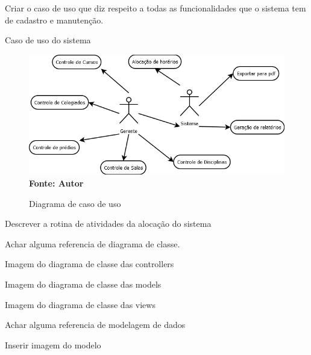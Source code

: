 \documentclass{abntpuc}
\begin{document}


	Criar o caso de uso que diz respeito a todas as funcionalidades que o sistema tem de cadastro e manutenção.\par

	Caso de uso do sistema\par

	\begin{figure}[!htb]
		\centering
   		\caption[Diagrama de caso de uso]{Diagrama de caso de uso}
   		\label{fig:figura2}
   		\centering
   		\includegraphics[scale=0.5]{diagramaCasoUso.png}
   		\\ \textbf{\footnotesize Fonte: Autor}
	\end{figure}


	
	Descrever a rotina de atividades da alocação do sistema
	

		
	Achar alguma referencia de diagrama de classe.

	Imagem do diagrama de classe das controllers

	
	Imagem do diagrama de classe das models

	
	Imagem do diagrama de classe das views


	Achar alguma referencia de modelagem de dados

	Inserir imagem do modelo
\end{document}
